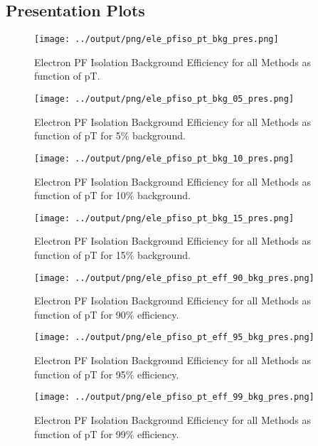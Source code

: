 \documentclass[11pt]{book}
\begin{document}
\subsection{Presentation Plots}
\begin{figure}[htb]
\centering
\texttt{[image: ../output/png/ele\_pfiso\_pt\_bkg\_pres.png]}
\caption{Electron PF Isolation Background Efficiency for all Methods as function of pT.}
\label{fig:ele_pfiso_pt_bkg_pres}
\end{figure}

\begin{figure}[htb]
\centering
\texttt{[image: ../output/png/ele\_pfiso\_pt\_bkg\_05\_pres.png]}
\caption{Electron PF Isolation Background Efficiency for all Methods as function of pT for 5\% background.}
\label{fig:ele_pfiso_pt_bkg_05_pres}
\end{figure}

\begin{figure}[htb]
\centering
\texttt{[image: ../output/png/ele\_pfiso\_pt\_bkg\_10\_pres.png]}
\caption{Electron PF Isolation Background Efficiency for all Methods as function of pT for 10\% background.}
\label{fig:ele_pfiso_pt_bkg_10_pres}
\end{figure}

\begin{figure}[htb]
\centering
\texttt{[image: ../output/png/ele\_pfiso\_pt\_bkg\_15\_pres.png]}
\caption{Electron PF Isolation Background Efficiency for all Methods as function of pT for 15\% background.}
\label{fig:ele_pfiso_pt_bkg_15_pres}
\end{figure}

\begin{figure}[htb]
\centering
\texttt{[image: ../output/png/ele\_pfiso\_pt\_eff\_90\_bkg\_pres.png]}
\caption{Electron PF Isolation Background Efficiency for all Methods as function of pT for 90\% efficiency.}
\label{fig:ele_pfiso_pt_eff_90_bkg_pres}
\end{figure}

\begin{figure}[htb]
\centering
\texttt{[image: ../output/png/ele\_pfiso\_pt\_eff\_95\_bkg\_pres.png]}
\caption{Electron PF Isolation Background Efficiency for all Methods as function of pT for 95\% efficiency.}
\label{fig:ele_pfiso_pt_eff_95_bkg_pres}
\end{figure}

\begin{figure}[htb]
\centering
\texttt{[image: ../output/png/ele\_pfiso\_pt\_eff\_99\_bkg\_pres.png]}
\caption{Electron PF Isolation Background Efficiency for all Methods as function of pT for 99\% efficiency.}
\label{fig:ele_pfiso_pt_eff_99_bkg_pres}
\end{figure}
\clearpage
\end{document}
